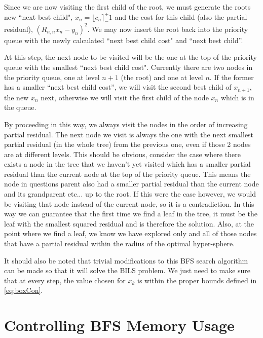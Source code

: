 \documentclass[12pt,Bold,letterpaper]{mcgilletdclass}
\newcommand{\vsp}{\vspace{\baselineskip}}
\begin{document}
Since we are now visiting the first child of the root, we must generate the roots new ``next best child", $x_n = \lfloor c_n \rceil ^+_- 1$ and the cost for this child (also the partial residual), $(R_{n,n}x_n - y_n)^2$. We may now insert the root back into the priority queue with the newly calculated ``next best child cost" and ``next best child''.
 
At this step, the next node to be visited will be the one at the top of the priority queue with the smallest ``next best child cost". Currently there are two nodes in the priority queue, one at level $n+1$ (the root) and one at level $n$. If the former has a smaller ``next best child cost'', we will visit the second best child of $x_{n+1}$, the new $x_{n}$ next, otherwise we will visit the first child of the node $x_{n}$ which is in the queue.

By proceeding in this way, we always visit the nodes in the order of increasing partial residual. The next node we visit is always the one with the next smallest partial residual (in the whole tree) from the previous one, even if those 2 nodes are at different levels. This should be obvious, consider the case where there exists a node in the tree that we haven't yet visited which has a smaller partial residual than the current node at the top of the priority queue. This means the node in questions parent also had a smaller partial residual than the current node and its grandparent etc... up to the root. If this were the case however, we would be visiting that node instead of the current node, so it is a contradiction. In this way we can guarantee that the first time we find a leaf in the tree, it must be the leaf with the smallest squared residual and is therefore the solution. Also, at the point where we find a leaf, we know we have explored only and all of those nodes that have a partial residual within the radius of the optimal hyper-sphere.

It should also be noted that trivial modifications to this BFS search algorithm can be made so that it will solve the BILS problem. We just need to make sure that at every step, the value chosen for $x_k$ is within the proper bounds defined in \ref{eq:boxCon}.

\vsp \section{Controlling BFS Memory Usage}
\end{document}
